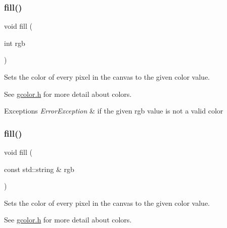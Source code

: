 \subsubsection{\texorpdfstring{fill()}{fill()}\hspace{0.1cm}{\footnotesize\ttfamily [1/2]}}
{\footnotesize\ttfamily void fill (\begin{DoxyParamCaption}\item[{int}]{rgb }\end{DoxyParamCaption})\hspace{0.3cm}{\ttfamily [virtual]}}



Sets the color of every pixel in the canvas to the given color value. 

See \mbox{\hyperlink{gcolor_8h_source}{gcolor.\+h}} for more detail about colors. 
\begin{DoxyExceptions}{Exceptions}
{\em Error\+Exception} & if the given rgb value is not a valid color \\
\hline
\end{DoxyExceptions}
\mbox{\label{classsgl_1_1GCanvas_a02a5aa7f1474eeedd181e6e46b5eee65}} 
\subsubsection{\texorpdfstring{fill()}{fill()}\hspace{0.1cm}{\footnotesize\ttfamily [2/2]}}
{\footnotesize\ttfamily void fill (\begin{DoxyParamCaption}\item[{const std\+::string \&}]{rgb }\end{DoxyParamCaption})\hspace{0.3cm}{\ttfamily [virtual]}}



Sets the color of every pixel in the canvas to the given color value. 

See \mbox{\hyperlink{gcolor_8h_source}{gcolor.\+h}} for more detail about colors. \mbox{\label{classsgl_1_1GDrawingSurface_a228075ad18bd97b57f9956568c4773f3}} 
